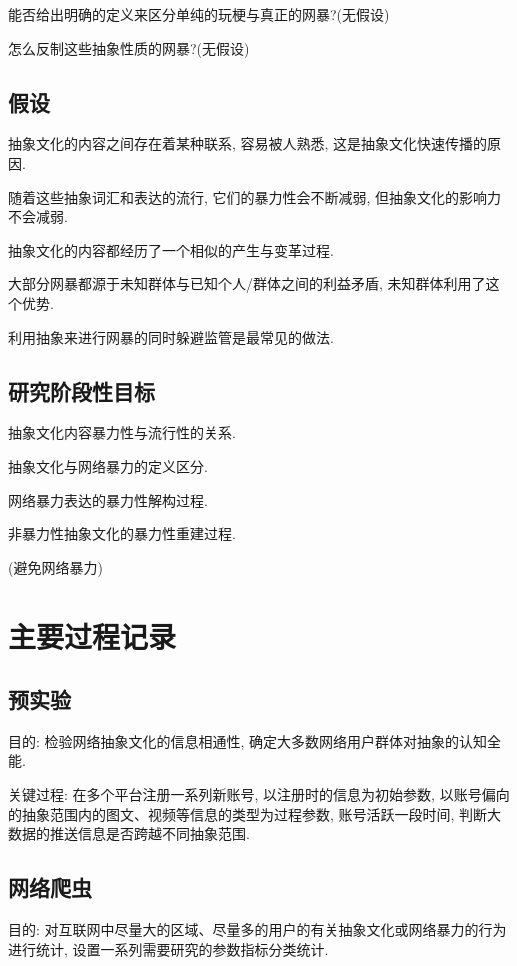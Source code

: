 \documentclass[12pt,a4paper]{ctexart}
\begin{document}
能否给出明确的定义来区分单纯的玩梗与真正的网暴?(无假设)

怎么反制这些抽象性质的网暴?(无假设)

\subsection{假设}

抽象文化的内容之间存在着某种联系, 容易被人熟悉, 这是抽象文化快速传播的原因.

随着这些抽象词汇和表达的流行, 它们的暴力性会不断减弱, 但抽象文化的影响力不会减弱.

抽象文化的内容都经历了一个相似的产生与变革过程.

大部分网暴都源于未知群体与已知个人/群体之间的利益矛盾, 未知群体利用了这个优势.

利用抽象来进行网暴的同时躲避监管是最常见的做法.

\subsection{研究阶段性目标}

抽象文化内容暴力性与流行性的关系.

抽象文化与网络暴力的定义区分.

网络暴力表达的暴力性解构过程.

非暴力性抽象文化的暴力性重建过程.

(避免网络暴力)

\section{主要过程记录}

\subsection{预实验}

目的: 检验网络抽象文化的信息相通性, 确定大多数网络用户群体对抽象的认知全能.

关键过程: 在多个平台注册一系列新账号, 以注册时的信息为初始参数, 以账号偏向的抽象范围内的图文、视频等信息的类型为过程参数, 账号活跃一段时间, 判断大数据的推送信息是否跨越不同抽象范围.

\subsection{网络爬虫}

目的: 对互联网中尽量大的区域、尽量多的用户的有关抽象文化或网络暴力的行为进行统计, 设置一系列需要研究的参数指标分类统计.
\end{document}
